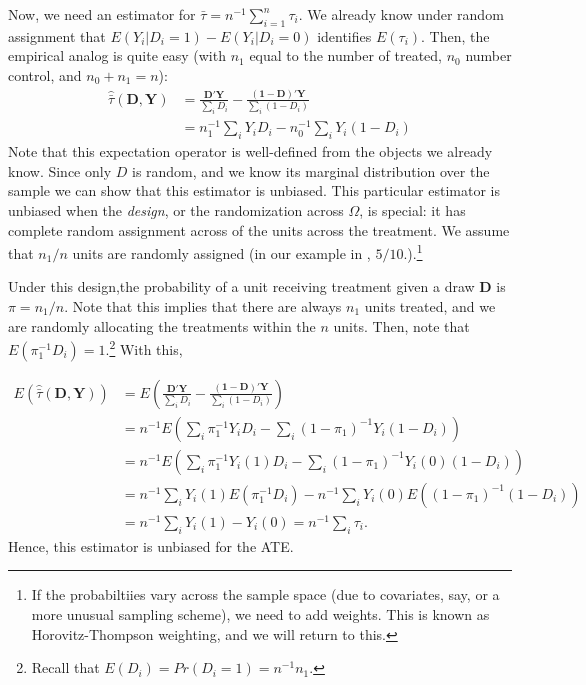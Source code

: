 \documentclass{tufte-handout}
\theoremstyle{break}
\newcommand{\bD}{\mathbf{D}}
\begin{document}
Now, we need an estimator for $\bar{\tau} = n^{-1}\sum_{i=1}^{n}\tau_{i}$. We already know under random assignment that $E(Y_{i}| D_{i} = 1) - E(Y_{i} | D_{i} = 0)$ identifies $E(\tau_{i})$. Then, the empirical analog is quite easy (with $n_{1}$ equal to the number of treated, $n_{0}$ number control, and $n_{0} + n_{1} = n$):
\begin{align}
  \hat{\bar{\tau}}(\mathbf{D}, \mathbf{Y}) & =   \frac{\mathbf{D}'\mathbf{Y}}{\sum_{i}D_{i}} - \frac{(\mathbf{1}-\mathbf{D})'\mathbf{Y}}{\sum_{i}(1-D_{i})} \\
                                           & = n_{1}^{-1}\sum_{i} Y_{i}D_{i} -  n_{0}^{-1}\sum_{i} Y_{i}(1-D_{i})
\end{align}
Note that this expectation operator is well-defined from the objects we already know. Since only $D$ is random, and we know its marginal distribution over the sample we can show that this estimator is unbiased. This particular estimator is unbiased when the \emph{design}, or the randomization across $\Omega$, is special: it has complete random assignment across of the units across the treatment. We assume that $n_{1}/n$ units are randomly assigned (in our example in , $5/10$.).\footnote{If the probabiltiies vary across the sample space (due to covariates, say, or a more unusual sampling scheme), we need to add weights. This is known as Horovitz-Thompson weighting, and we will return to this.}

Under this design,the probability of a unit receiving treatment given a draw $\bD$ is $\pi = n_{1}/n$. Note that this implies that there are always $n_{1}$ units treated, and we are randomly allocating the treatments within the $n$ units. Then, note that $E(\pi_{1}^{-1}D_{i}) = 1$.\footnote{Recall that $E(D_{i}) = Pr(D_{i} = 1) =  n^{-1}n_{1}.$} With this,

\begin{align*}
  E(\hat{\bar{\tau}}(\mathbf{D}, \mathbf{Y})) & = E\left(\frac{\mathbf{D}'\mathbf{Y}}{\sum_{i}D_{i}} - \frac{(\mathbf{1}-\mathbf{D})'\mathbf{Y}}{\sum_{i}(1-D_{i})}\right) \\
  & =n^{-1}E\left(\sum_{i}\pi_{1}^{-1}Y_{i}D_{i} - \sum_{i}(1-\pi_{1})^{-1}Y_{i}(1-D_{i})\right)                               \\
& =n^{-1}E\left(\sum_{i}\pi_{1}^{-1}Y_{i}(1)D_{i} - \sum_{i}(1-\pi_{1})^{-1}Y_{i}(0)(1-D_{i})\right)                         \\
& =n^{-1}\sum_{i}Y_{i}(1)E\left(\pi_{1}^{-1}D_{i}\right) - n^{-1}\sum_{i}Y_{i}(0)E\left((1-\pi_{1})^{-1}(1-D_{i})\right)     \\
    & =n^{-1}\sum_{i}Y_{i}(1) - Y_{i}(0) = n^{-1}\sum_{i}\tau_{i}.
\end{align*}
Hence, this estimator is unbiased for the ATE.
\end{document}
